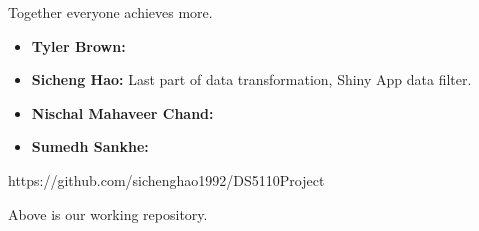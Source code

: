 \documentclass[12pt]{article}
\begin{document}
Together everyone achieves more.

\begin{itemize}
\item \textbf{Tyler Brown:}
\item \textbf{Sicheng Hao:} Last part of data transformation, Shiny App data filter.
\item \textbf{Nischal Mahaveer Chand:}
\item \textbf{Sumedh Sankhe:}
\end{itemize}

 


\begin{appendices}

https://github.com/sichenghao1992/DS5110Project

Above is our working repository.

\end{appendices}
\end{document}
